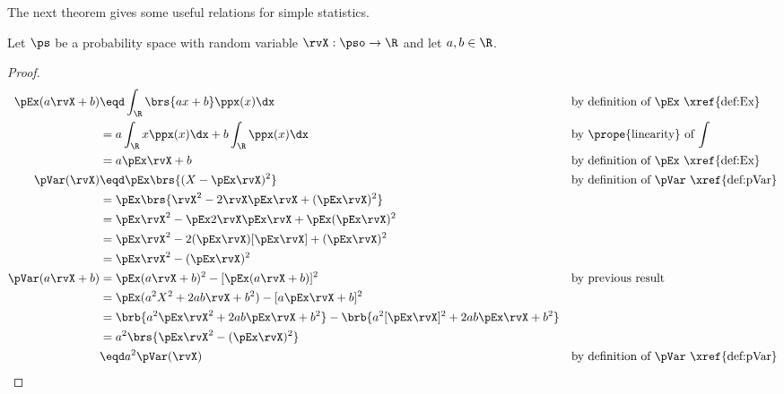 The next theorem gives some useful relations for simple statistics.
\begin{theorem}
Let $\ps$ be a probability space with random variable $\rvX:\pso\to\R$
and let $a,b\in\R$.
\end{theorem}
\begin{proof}
\begin{align*}
  \pEx(a\rvX+b)
    &\eqd \int_\R \brs{ax+b}\ppx(x) \dx
    &&    \text{by definition of $\pEx$ \xref{def:Ex}}
  \\&=    a\int_\R x \ppx(x)\dx + b\int_\R \ppx(x)\dx
    &&    \text{by \prope{linearity} of $\int$}
  \\&=    a\pEx\rvX + b
    &&    \text{by definition of $\pEx$ \xref{def:Ex}}
\\
  \pVar(\rvX)
    &\eqd \pEx\brs{(X-\pEx\rvX)^2}
    &&    \text{by definition of $\pVar$ \xref{def:pVar}}
  \\&=    \pEx\brs{\rvX^2-2\rvX\pEx\rvX + (\pEx\rvX)^2}
  \\&=    \pEx\rvX^2  - \pEx 2\rvX\pEx\rvX  + \pEx (\pEx\rvX)^2
  \\&=    \pEx\rvX^2 - 2(\pEx\rvX)[\pEx\rvX] + (\pEx\rvX)^2
  \\&=    \pEx\rvX^2  - (\pEx\rvX)^2
\\
  \pVar(a\rvX+b)
    &=    \pEx(a\rvX+b)^2  - [\pEx(a\rvX+b)]^2
    &&    \text{by previous result}
  \\&=    \pEx(a^2X^2+2ab\rvX+b^2)  - [a\pEx\rvX+b]^2
  \\&=    \brb{a^2 \pEx\rvX^2 + 2ab\pEx\rvX + b^2}  - \brb{a^2[\pEx\rvX]^2 + 2ab\pEx\rvX + b^2}
  \\&=    a^2\brs{\pEx\rvX^2  - (\pEx\rvX)^2}
  \\&\eqd a^2 \pVar(\rvX)
    &&    \text{by definition of $\pVar$ \xref{def:pVar}}
\end{align*}
\end{proof}


